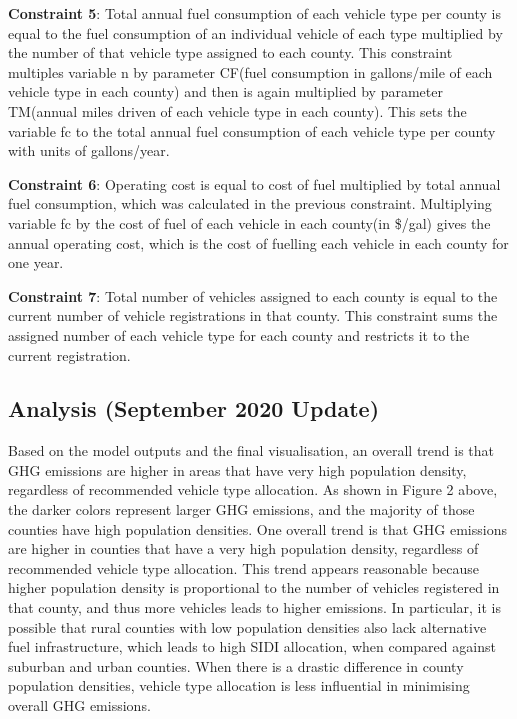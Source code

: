 \documentclass[answers]{exam}
\begin{document}
\begin{outline}
\1 \textbf{Constraint 5}: Total annual fuel consumption of each vehicle type per county is equal to the fuel consumption of an individual vehicle of each type multiplied by the number of that vehicle type assigned to each county. This constraint multiples variable n by parameter CF(fuel consumption in gallons/mile of each vehicle type in each county) and then is again multiplied by parameter TM(annual miles driven of each vehicle type in each county). This sets the variable fc to the total annual fuel consumption of each vehicle type per county with units of gallons/year. 

\1 \textbf{Constraint 6}: Operating cost is equal to cost of fuel multiplied by total annual fuel consumption, which was calculated in the previous constraint. Multiplying variable fc by the cost of fuel of each vehicle in each county(in \$/gal) gives the annual operating cost, which is the cost of fuelling each vehicle in each county for one year. 

\1 \textbf{Constraint 7}: Total number of vehicles assigned to each county is equal to the current number of vehicle registrations in that county. This constraint sums the assigned number of each vehicle type for each county and restricts it to the current registration. 
\end{outline}
\subsection{Analysis (September 2020 Update)}
Based on the model outputs and the final visualisation, an overall trend is that GHG emissions are higher in areas that have very high population density, regardless of recommended vehicle type allocation. As shown in Figure 2 above, the darker colors represent larger GHG emissions, and the majority of those counties have high population densities. One overall trend is that GHG emissions are higher in counties that have a very high population density, regardless of recommended vehicle type allocation. This trend appears reasonable because higher population density is proportional to the number of vehicles registered in that county, and thus more vehicles leads to higher emissions. In particular, it is possible that rural counties with low population densities also lack alternative fuel infrastructure, which leads to high SIDI allocation, when compared against suburban and urban counties. When there is a drastic difference in county population densities, vehicle type allocation is less influential in minimising overall GHG emissions. 
\end{document}
